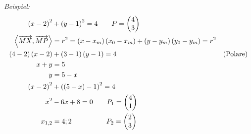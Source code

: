 \textit{Beispiel:}
\begin{align*}
    \left( x - 2 \right)^{2} & + \left( y - 1 \right)^{2} = 4 \qquad P =
    \begin{pmatrix}
        4 \\ 3
    \end{pmatrix}\\
    \left\langle \overrightarrow{MX}, \overrightarrow{MP} \right\rangle & = r^{2} = \left( x - x_{m} \right)\left( x_{0} - x_{m} \right) + \left( y - y_{m} \right)\left( y_{0} - y_{m} \right) = r^{2}\\
    \left( 4 - 2 \right)\left( x - 2 \right) & + \left( 3 - 1 \right)\left( y - 1 \right) = 4 & \left( \text{Polare} \right)\\
    x + y & = 5\\
    y & = 5 - x\\
    \left( x - 2 \right)^{2} & + \left( \left( 5 - x \right) - 1 \right)^{2} = 4\\
    x^{2} & - 6 x + 8 = 0 \qquad P_{1} =
    \begin{pmatrix}
        4\\ 1
    \end{pmatrix}\\
    x_{1,2} & = 4;2 \qquad\qquad\ \ \ P_{2} =
    \begin{pmatrix}
        2\\ 3
    \end{pmatrix}
\end{align*}


